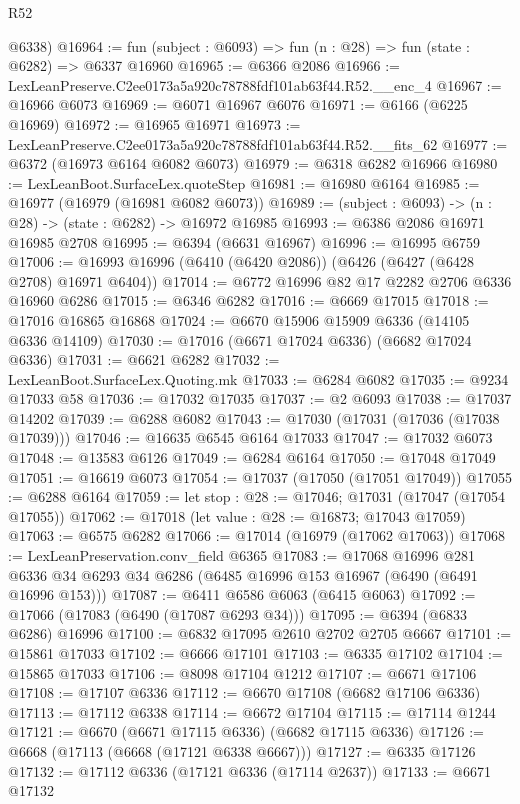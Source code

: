 \begin{lexlean}{R52}
\begin{coremodule}
      @6338)
@16964 := fun (subject : @6093) => fun (n : @28) => fun (state : @6282) => @6337 @16960
@16965 := @6366 @2086
@16966 := LexLeanPreserve.C2ee0173a5a920c78788fdf101ab63f44.R52.__enc_4
@16967 := @16966 @6073
@16969 := @6071 @16967 @6076
@16971 := @6166 (@6225 @16969)
@16972 := @16965 @16971
@16973 := LexLeanPreserve.C2ee0173a5a920c78788fdf101ab63f44.R52.__fits_62
@16977 := @6372 (@16973 @6164 @6082 @6073)
@16979 := @6318 @6282 @16966
@16980 := LexLeanBoot.SurfaceLex.quoteStep
@16981 := @16980 @6164
@16985 := @16977 (@16979 (@16981 @6082 @6073))
@16989 := (subject : @6093) -> (n : @28) -> (state : @6282) -> @16972 @16985
@16993 := @6386 @2086 @16971 @16985 @2708
@16995 := @6394 (@6631 @16967)
@16996 := @16995 @6759
@17006 := @16993 @16996 (@6410 (@6420 @2086)) (@6426 (@6427 (@6428 @2708) @16971 @6404))
@17014 := @6772 @16996 @82 @17 @2282 @2706 @6336 @16960 @6286
@17015 := @6346 @6282
@17016 := @6669 @17015
@17018 := @17016 @16865 @16868
@17024 := @6670 @15906 @15909 @6336 (@14105 @6336 @14109)
@17030 := @17016 (@6671 @17024 @6336) (@6682 @17024 @6336)
@17031 := @6621 @6282
@17032 := LexLeanBoot.SurfaceLex.Quoting.mk
@17033 := @6284 @6082
@17035 := @9234 @17033 @58
@17036 := @17032 @17035
@17037 := @2 @6093
@17038 := @17037 @14202
@17039 := @6288 @6082
@17043 := @17030 (@17031 (@17036 (@17038 @17039)))
@17046 := @16635 @6545 @6164 @17033
@17047 := @17032 @6073
@17048 := @13583 @6126
@17049 := @6284 @6164
@17050 := @17048 @17049
@17051 := @16619 @6073
@17054 := @17037 (@17050 (@17051 @17049))
@17055 := @6288 @6164
@17059 := let stop : @28 := @17046; @17031 (@17047 (@17054 @17055))
@17062 := @17018 (let value : @28 := @16873; @17043 @17059)
@17063 := @6575 @6282
@17066 := @17014 (@16979 (@17062 @17063))
@17068 := LexLeanPreservation.conv_field @6365
@17083 := @17068
    @16996
    @281
    @6336
    @34
    @6293
    @34
    @6286
    (@6485 @16996 @153 @16967 (@6490 (@6491 @16996 @153)))
@17087 := @6411 @6586 @6063 (@6415 @6063)
@17092 := @17066 (@17083 (@6490 (@17087 @6293 @34)))
@17095 := @6394 (@6833 @6286) @16996
@17100 := @6832 @17095 @2610 @2702 @2705 @6667
@17101 := @15861 @17033
@17102 := @6666 @17101
@17103 := @6335 @17102
@17104 := @15865 @17033
@17106 := @8098 @17104 @1212
@17107 := @6671 @17106
@17108 := @17107 @6336
@17112 := @6670 @17108 (@6682 @17106 @6336)
@17113 := @17112 @6338
@17114 := @6672 @17104
@17115 := @17114 @1244
@17121 := @6670 (@6671 @17115 @6336) (@6682 @17115 @6336)
@17126 := @6668 (@17113 (@6668 (@17121 @6338 @6667)))
@17127 := @6335 @17126
@17132 := @17112 @6336 (@17121 @6336 (@17114 @2637))
@17133 := @6671 @17132

\end{coremodule}
\end{lexlean}
